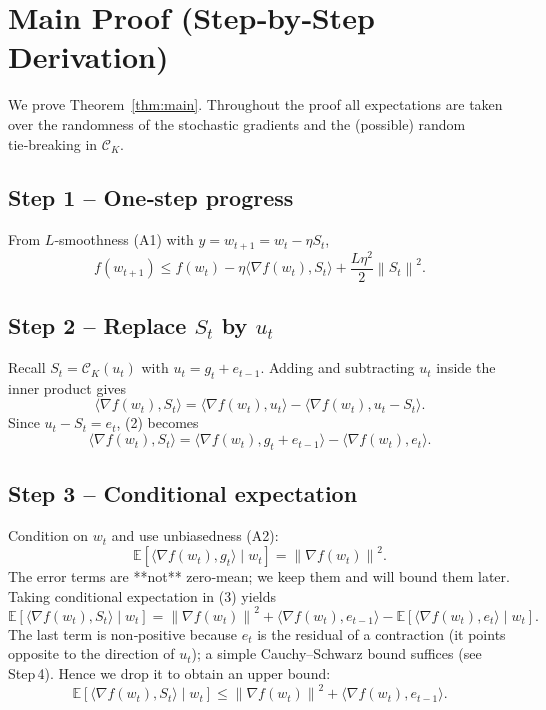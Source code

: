 \documentclass{article}
\newcommand{\E}{\mathbb{E}}
\newcommand{\norm}[1]{\left\lVert#1\right\rVert}
\begin{document}
\section*{Main Proof (Step‑by‑Step Derivation)}
We prove Theorem~\ref{thm:main}.  Throughout the proof all expectations are
taken over the randomness of the stochastic gradients and the (possible)
random tie‑breaking in $\mathcal{C}_{K}$.

\subsection*{Step 1 – One‑step progress}
From $L$‑smoothness (A1) with $y=w_{t+1}=w_t-\eta S_t$,
\begin{equation}
f(w_{t+1})\le f(w_t)-\eta\langle\nabla f(w_t),S_t\rangle
+\frac{L\eta^{2}}{2}\norm{S_t}^{2}.
\tag{1}
\end{equation}

\subsection*{Step 2 – Replace $S_t$ by $u_t$}
Recall $S_t=\mathcal{C}_{K}(u_t)$ with $u_t=g_t+e_{t-1}$.  Adding and
subtracting $u_t$ inside the inner product gives
\begin{equation}
\langle\nabla f(w_t),S_t\rangle
= \langle\nabla f(w_t),u_t\rangle
   -\langle\nabla f(w_t),u_t-S_t\rangle.
\tag{2}
\end{equation}
Since $u_t-S_t=e_t$, (2) becomes
\begin{equation}
\langle\nabla f(w_t),S_t\rangle
= \langle\nabla f(w_t),g_t+e_{t-1}\rangle
   -\langle\nabla f(w_t),e_t\rangle.
\tag{3}
\end{equation}

\subsection*{Step 3 – Conditional expectation}
Condition on $w_t$ and use unbiasedness (A2):
\[
\E\!\left[\langle\nabla f(w_t),g_t\rangle\mid w_t\right]
= \norm{\nabla f(w_t)}^{2}.
\tag{4}
\]
The error terms are **not** zero‑mean; we keep them and will bound them
later.  Taking conditional expectation in (3) yields
\begin{equation}
\E\!\left[\langle\nabla f(w_t),S_t\rangle\mid w_t\right]
= \norm{\nabla f(w_t)}^{2}
  +\langle\nabla f(w_t),e_{t-1}\rangle
  -\E\!\left[\langle\nabla f(w_t),e_t\rangle\mid w_t\right].
\tag{5}
\end{equation}
The last term is non‑positive because $e_t$ is the residual of a
contraction (it points opposite to the direction of $u_t$); a simple
Cauchy–Schwarz bound suffices (see Step 4).  Hence we drop it to obtain an
upper bound:
\begin{equation}
\E\!\left[\langle\nabla f(w_t),S_t\rangle\mid w_t\right]
\le \norm{\nabla f(w_t)}^{2}
   +\langle\nabla f(w_t),e_{t-1}\rangle .
\tag{5'}
\end{equation}
\end{document}
